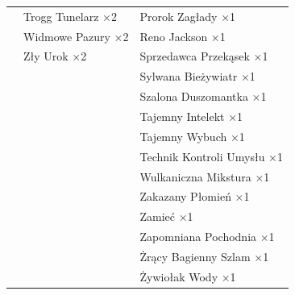 \begin{table}[p]
\begin{tabular}{p{4.8cm} p{4.8cm} p{4.8cm}}
                                & Trogg Tunelarz ×2            & Prorok Zagłady ×1 \\
                                & Widmowe Pazury ×2            & Reno Jackson ×1 \\
                                & Zły Urok ×2                  & Sprzedawca Przekąsek ×1 \\
                                &                              & Sylwana Bieżywiatr ×1 \\
                                &                              & Szalona Duszomantka ×1 \\
                                &                              & Tajemny Intelekt ×1 \\
                                &                              & Tajemny Wybuch ×1 \\
                                &                              & Technik Kontroli Umysłu ×1 \\
                                &                              & Wulkaniczna Mikstura ×1 \\
                                &                              & Zakazany Płomień ×1 \\
                                &                              & Zamieć ×1 \\
                                &                              & Zapomniana Pochodnia ×1 \\
                                &                              & Żrący Bagienny Szlam ×1 \\
                                &                              & Żywiołak Wody ×1 \\
\bottomrule
\end{tabular}
\end{table}
